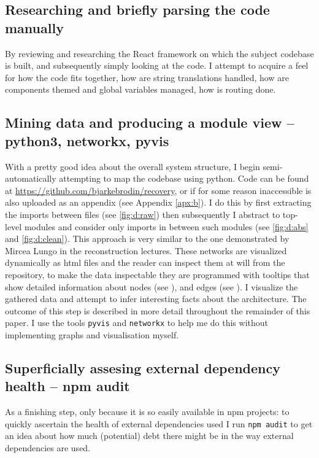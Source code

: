 \documentclass{article}
\begin{document}
\subsection{Researching and briefly parsing the code manually}

By reviewing and researching the React framework on which the subject codebase is built,
and subsequently simply looking at the code. 
I attempt to acquire a feel for how the code fits together,
how are string translations handled,
how are components themed and global variables managed,
how is routing done.

\subsection{Mining data and producing a module view -- python3, networkx, pyvis}

With a pretty good idea about the overall system structure,
I begin semi-automatically attempting to map the codebase using python.
Code can be found at \href{https://github.com/bjarkebrodin/recovery}{https://github.com/bjarkebrodin/recovery},
or if for some reason inaccessible is also uploaded as an appendix (see Appendix \ref{apx:b}).
I do this by first extracting the imports between files (see \ref{fig:d:raw})
then subsequently I abstract to top-level modules and consider only imports in between such modules (see \ref{fig:d:abs} and \ref{fig:d:clean}).
This approach is very similar to the one demonstrated by Mircea Lungo in the reconstruction lectures\cite{reconstruction}.
These networks are visualized dynamically as html files and the reader can inspect them at will from the repository,
to make the data inspectable they are programmed with tooltips that show detailed information about nodes (see ), and edges (see ).
I visualize the gathered data and attempt to infer interesting facts about the architecture.
The outcome of this step is described in more detail throughout the remainder of this paper.
I use the tools \verb|pyvis|\cite{pyvis} and \verb|networkx|\cite{networkx} to help me do this without implementing graphs and visualisation myself.

\subsection{Superficially assesing external dependency health -- npm audit}

As a finishing step, only because it is so easily available in npm projects:
to quickly ascertain the health of external dependencies used I run \verb|npm audit|
to get an idea about how much (potential) debt there might be in the way external dependencies are used.
\end{document}
